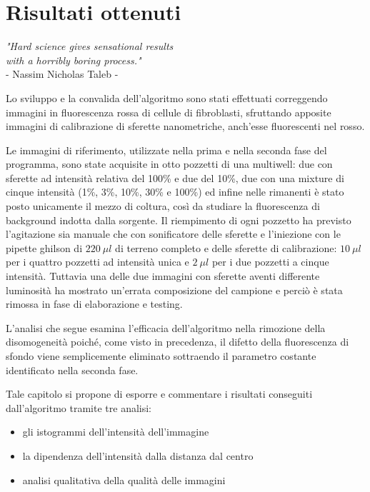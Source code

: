 \clearpage{\pagestyle{empty}\cleardoublepage}

\chapter{Risultati ottenuti}

\begin{flushright}\begin{small}\textit{"Hard science gives sensational results\\ with a horribly boring process."}\\
- Nassim Nicholas Taleb -\\
\end{small}\end{flushright}

Lo sviluppo e la convalida dell'algoritmo sono stati effettuati correggendo immagini in fluorescenza rossa di cellule di fibroblasti, sfruttando apposite immagini di calibrazione di sferette nanometriche, anch'esse fluorescenti nel rosso.

Le immagini di riferimento, utilizzate nella prima e nella seconda fase del programma, sono state acquisite in otto pozzetti di una multiwell: due con sferette ad intensità relativa del 100\% e due del 10\%, due con una mixture di cinque intensità (1\%, 3\%, 10\%, 30\% e 100\%) ed infine nelle rimanenti è stato posto unicamente il mezzo di coltura, così da studiare la fluorescenza di background indotta dalla sorgente.
Il riempimento di ogni pozzetto ha previsto l'agitazione sia manuale che con sonificatore delle sferette e l'iniezione con le pipette ghilson di $220\ \mu l$ di terreno completo e delle sferette di calibrazione: $10\ \mu l$ per i quattro pozzetti ad intensità unica e $2\ \mu l$ per i due pozzetti a cinque intensità.
Tuttavia una delle due immagini con sferette aventi differente luminosità ha mostrato un'errata composizione del campione e perciò è stata rimossa in fase di elaborazione e testing.

L'analisi che segue esamina l'efficacia dell'algoritmo nella rimozione della disomogeneità poiché, come visto in precedenza, il difetto della fluorescenza di sfondo viene semplicemente eliminato sottraendo il parametro costante identificato nella seconda fase.

Tale capitolo si propone di esporre e commentare i risultati conseguiti dall'algoritmo tramite tre analisi: 
\begin{itemize}
 \item gli istogrammi dell'intensità dell'immagine
 \item la dipendenza dell'intensità dalla distanza dal centro
 \item analisi qualitativa della qualità delle immagini
\end{itemize}

